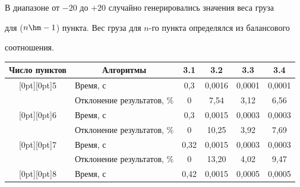   В диапазоне от $-20$ до $+20$ случайно генерировались значения веса груза 


для ($n\hm-1$) пункта. Вес груза для $n$-го пункта определялся из балансового 


соотношения. 





\begin{table}[b]\small


\vspace*{-20pt}


\begin{center}




\vspace*{2ex}





\tabcolsep=5.5pt


\begin{tabular}{|c|l|c|c|c|c|}


\hline


Число пунктов&\multicolumn{1}{c|}{Алгоритмы}&3.1&3.2&3.3&3.4\\


\hline


\multicolumn{1}{|c|}{\raisebox{-6pt}[0pt][0pt]{5}}&Время, с&0,3&0,0016&0,0001&0,0001\\


&Отклонение результатов, \%&0&7,54&3,12&6,56\\


\hline


\multicolumn{1}{|c|}{\raisebox{-6pt}[0pt][0pt]{6}}&Время, с&0,3&0,0015&0,0003&0,0003\\


&Отклонение результатов, \%&0&10,25&3,92&7,69\\


\hline


\multicolumn{1}{|c|}{\raisebox{-6pt}[0pt][0pt]{7}}&Время, с&0,32&0,0015&0,0003&0,0003\\


&Отклонение результатов, \%&0&13,20&4,02&9,47\\


\hline


\multicolumn{1}{|c|}{\raisebox{-6pt}[0pt][0pt]{8}}&Время, с&0,42&0,0015&0,0005&0,0005\\



\end{tabular}
\end{center}
\end{table}
